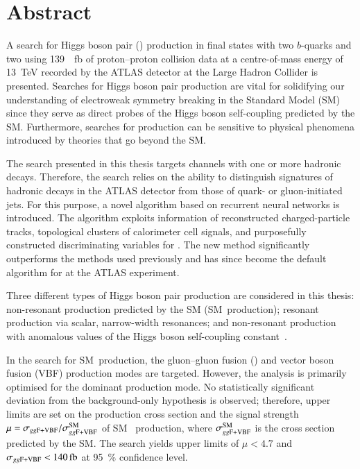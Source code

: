 \chapter*{Abstract}

A search for Higgs boson pair (\HH) production in final states with two
$b$-quarks and two \tauleptons using \SI{139}{\per\femto\barn} of proton--proton
collision data at a centre-of-mass energy of \SI{13}{\TeV} recorded by the ATLAS
detector at the Large Hadron Collider
is presented. Searches for Higgs boson pair production are vital for solidifying
our understanding of electroweak symmetry breaking in the Standard Model (SM)
since they serve as direct probes of the Higgs boson self-coupling predicted by
the SM. Furthermore, searches for \HH production can be sensitive to physical
phenomena introduced by theories that go beyond the SM.

The search presented in this thesis targets channels with one or more hadronic
\taulepton decays. Therefore, the search relies on the ability to distinguish
signatures of hadronic \taulepton decays in the ATLAS detector from those of
quark- or gluon-initiated jets. For this purpose, a novel \tauid algorithm based
on recurrent neural networks is introduced. The algorithm exploits information
of reconstructed charged-particle tracks, topological clusters of calorimeter
cell signals, and purposefully constructed discriminating variables for
\tauid. The new \tauid method significantly outperforms the methods used
previously and has since become the default algorithm for \tauid at the ATLAS
experiment.

Three different types of Higgs boson pair production are considered in this
thesis: non-resonant \HH production predicted by the SM (SM~\HH production);
resonant \HH production via scalar, narrow-width resonances; and non-resonant
\HH production with anomalous values of the Higgs boson self-coupling
constant~\lambdahhh.

In the search for SM~\HH production, the gluon--gluon fusion (\ggF) and vector
boson fusion (VBF) production modes are targeted. However, the analysis is
primarily optimised for the dominant \ggF production mode. No statistically
significant deviation from the background-only hypothesis is observed;
therefore, upper limits are set on the production cross section \xsecggfvbf and
the signal strength~$\mu = \sigma_{gg\text{F+VBF}} / \sigma_{gg\text{F+VBF}}^{\text{SM}}$ of SM~\HH
production, where $\sigma_{gg\text{F+VBF}}^{\text{SM}}$ is the cross section predicted by
the SM. The search yields upper limits of $\mu < \num{4.7}$ and
$\xsecggfvbf < \SI{140}{\femto\barn}$ at \SI{95}{\percent} confidence level.

